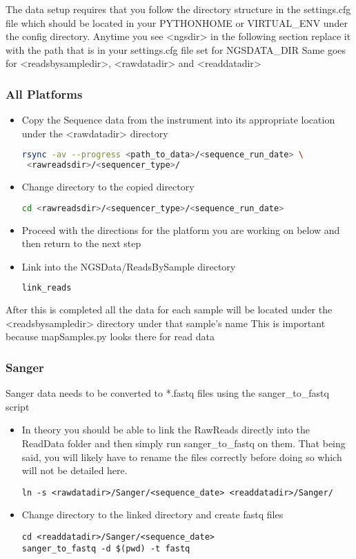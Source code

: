 \documentclass{article}
\begin{document}
The data setup requires that you follow the directory structure in the settings.cfg file which should be located in your PYTHONHOME or VIRTUAL\_ENV under the config directory.
Anytime you see <ngsdir> in the following section replace it with the path that is in your settings.cfg file set for NGSDATA\_DIR
Same goes for <readsbysampledir>, <rawdatadir> and <readdatadir>

\subsubsection{All Platforms}
\begin{itemize}
\item Copy the Sequence data from the instrument into its appropriate location under the <rawdatadir> directory
\begin{lstlisting}[language=bash]
rsync -av --progress <path_to_data>/<sequence_run_date> \
 <rawreadsdir>/<sequencer_type>/
\end{lstlisting}

\item Change directory to the copied directory
{\tiny
\begin{lstlisting}[language=bash]
cd <rawreadsdir>/<sequencer_type>/<sequence_run_date>
\end{lstlisting}
}

\item Proceed with the directions for the platform you are working on below and then return to the next step

\item Link into the NGSData/ReadsBySample directory
{\tiny
\begin{lstlisting}[language=bash]
link_reads
\end{lstlisting}
}
\end{itemize}

After this is completed all the data for each sample will be located under the <readsbysampledir> directory under that sample's name
This is important because mapSamples.py looks there for read data

\subsubsection{Sanger}
Sanger data needs to be converted to *.fastq files using the sanger\_to\_fastq script
\begin{itemize}
 \item In theory you should be able to link the RawReads directly into the ReadData folder and then simply run sanger\_to\_fastq on them. That being said, you will likely have to rename the files correctly before doing so which will not be detailed here.
\begin{lstlisting}
ln -s <rawdatadir>/Sanger/<sequence_date> <readdatadir>/Sanger/
\end{lstlisting}
 \item Change directory to the linked directory and create fastq files
\begin{lstlisting}
cd <readdatadir>/Sanger/<sequence_date>
sanger_to_fastq -d $(pwd) -t fastq
\end{lstlisting}
\end{itemize}
\end{document}

